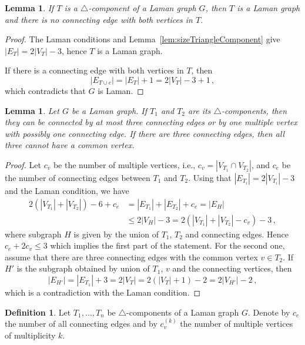\documentclass[a4paper, 11pt]{article}
\newcommand{\trcomp}{$\triangle$-component}
\newcommand{\trcomps}{$\triangle$-components}
\newcommand{\cv}[1]{c_v^{(#1)}}
\newtheorem{lem}[thm]{Lemma}
\theoremstyle{definition}
\newtheorem{defn}{Definition}[section]
\begin{document}
\begin{lem}
\label{lem:noEdgeInSameComponent}
If $T$ is a \trcomp{} of  a Laman graph $G$, then $T$ is a Laman graph and there is no connecting edge with both vertices in $T$.
\end{lem}
\begin{proof}
The Laman conditions and Lemma~\ref{lem:sizeTriangleComponent} give $|E_T|= 2|V_T|-3$, hence $T$ is a Laman graph.

If there is a connecting edge with both vertices in $T$, then
$$
|E_{T\cup e}|=|E_T| +1 =2|V_T| -3+1\,,
$$
which contradicts that $G$ is Laman.
\end{proof}

\begin{lem}
\label{lem:threeEdgesOrVertexAndEdge}
Let $G$ be a Laman graph. If $T_1$ and $T_2$ are its \trcomps{}, then they can be connected by at most three connecting edges or by one multiple vertex with possibly one connecting edge. If there are three connecting edges, then all three cannot have a common vertex.
\end{lem}
\begin{proof}
Let $c_v$ be the number of multiple vertices, i.e., $c_v=|V_{T_1}\cap V_{T_2}|$, and $c_e$ be the number of connecting edges between $T_1$ and $T_2$. Using that $|E_{T_i}|= 2|V_{T_i}|-3$ and the Laman condition, we have
\begin{align*}
2(|V_{T_1}|+|V_{T_2}|)-6 +c_e&=|E_{T_1}|+|E_{T_2}|+c_e=|E_{H}| \\
&\leq 2|V_H| -3=2(|V_{T_1}|+|V_{T_2}|-c_v)-3\,,
\end{align*}
where subgraph $H$ is given by the union of $T_1$, $T_2$ and connecting edges. Hence $c_e+2c_v \leq 3$ which implies the first part of the statement. For the second one, assume that there are three connecting edges with the common vertex  $v\in T_2$. If $H'$ is the subgraph obtained by union of $T_1$, $v$ and the connecting vertices, then
$$
|E_{H'}|=|E_{T_1}|+3=2|V_T|=2(|V_T|+1)-2=2|V_{H'}|-2\,,
$$
which is a contradiction with the Laman condition.
\end{proof}

\begin{defn}
Let $T_1, \dots, T_n$ be \trcomps{} of a Laman graph $G$. Denote by $c_e$ the number of all connecting edges and by $\cv{k}$ the number of multiple vertices of multiplicity $k$.
\end{defn}
\end{document}
